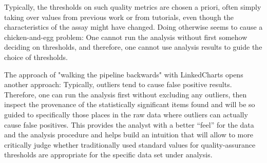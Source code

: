 \documentclass[twocolumn,10pt]{article}
\begin{document}
Typically, the thresholds on such quality metrics are chosen a priori, often simply taking over values from previous work or from tutorials, even though the characteristics of the assay might have changed. Doing otherwise seems to cause a chicken-and-egg problem: One cannot run the analysis without first somehow deciding on thresholds, and therefore, one cannot use analysis results to guide the choice of thresholds.

The approach of "walking the pipeline backwards" with LinkedCharts opens another approach: Typically, outliers tend to cause false positive results. Therefore, one can run the analysis first without excluding any outliers, then inspect the provenance of the statistically significant items found and will be so guided to specifically those places in the raw data where outliers can actually cause false positives. This provides the analyst with a better ``feel'' for the data and the analysis procedure and helps build an intuition that will allow to more critically judge whether traditionally used standard values for quality-assurance thresholds are appropriate for the specific data set under analysis. 
\end{document}
